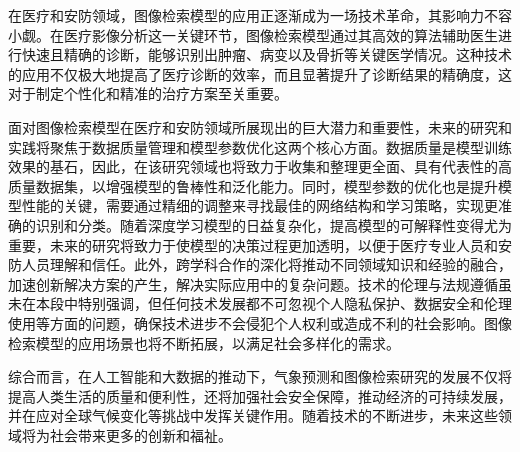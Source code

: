 在医疗和安防领域，图像检索模型的应用正逐渐成为一场技术革命，其影响力不容小觑。在医疗影像分析这一关键环节，图像检索模型通过其高效的算法辅助医生进行快速且精确的诊断，能够识别出肿瘤、病变以及骨折等关键医学情况。这种技术的应用不仅极大地提高了医疗诊断的效率，而且显著提升了诊断结果的精确度，这对于制定个性化和精准的治疗方案至关重要。

面对图像检索模型在医疗和安防领域所展现出的巨大潜力和重要性，未来的研究和实践将聚焦于数据质量管理和模型参数优化这两个核心方面。数据质量是模型训练效果的基石，因此，在该研究领域也将致力于收集和整理更全面、具有代表性的高质量数据集，以增强模型的鲁棒性和泛化能力。同时，模型参数的优化也是提升模型性能的关键，需要通过精细的调整来寻找最佳的网络结构和学习策略，实现更准确的识别和分类。随着深度学习模型的日益复杂化，提高模型的可解释性变得尤为重要，未来的研究将致力于使模型的决策过程更加透明，以便于医疗专业人员和安防人员理解和信任。此外，跨学科合作的深化将推动不同领域知识和经验的融合，加速创新解决方案的产生，解决实际应用中的复杂问题。技术的伦理与法规遵循虽未在本段中特别强调，但任何技术发展都不可忽视个人隐私保护、数据安全和伦理使用等方面的问题，确保技术进步不会侵犯个人权利或造成不利的社会影响。图像检索模型的应用场景也将不断拓展，以满足社会多样化的需求。

综合而言，在人工智能和大数据的推动下，气象预测和图像检索研究的发展不仅将提高人类生活的质量和便利性，还将加强社会安全保障，推动经济的可持续发展，并在应对全球气候变化等挑战中发挥关键作用。随着技术的不断进步，未来这些领域将为社会带来更多的创新和福祉。

